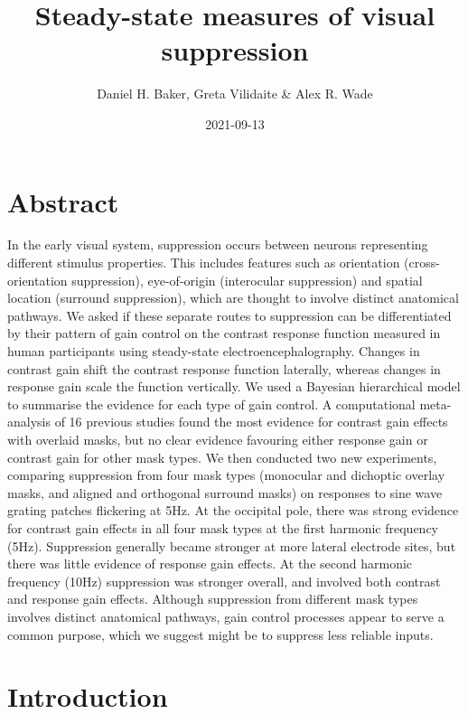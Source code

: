 \documentclass[]{article}
\title{Steady-state measures of visual suppression}
\author{Daniel H. Baker, Greta Vilidaite \& Alex R. Wade}
\date{2021-09-13}
\begin{document}
\maketitle

\hypertarget{abstract}{%
\section{Abstract}\label{abstract}}

In the early visual system, suppression occurs between neurons representing different stimulus properties. This includes features such as orientation (cross-orientation suppression), eye-of-origin (interocular suppression) and spatial location (surround suppression), which are thought to involve distinct anatomical pathways. We asked if these separate routes to suppression can be differentiated by their pattern of gain control on the contrast response function measured in human participants using steady-state electroencephalography. Changes in contrast gain shift the contrast response function laterally, whereas changes in response gain scale the function vertically. We used a Bayesian hierarchical model to summarise the evidence for each type of gain control. A computational meta-analysis of 16 previous studies found the most evidence for contrast gain effects with overlaid masks, but no clear evidence favouring either response gain or contrast gain for other mask types. We then conducted two new experiments, comparing suppression from four mask types (monocular and dichoptic overlay masks, and aligned and orthogonal surround masks) on responses to sine wave grating patches flickering at 5Hz. At the occipital pole, there was strong evidence for contrast gain effects in all four mask types at the first harmonic frequency (5Hz). Suppression generally became stronger at more lateral electrode sites, but there was little evidence of response gain effects. At the second harmonic frequency (10Hz) suppression was stronger overall, and involved both contrast and response gain effects. Although suppression from different mask types involves distinct anatomical pathways, gain control processes appear to serve a common purpose, which we suggest might be to suppress less reliable inputs.

\hypertarget{introduction}{%
\section{Introduction}\label{introduction}}
\end{document}
